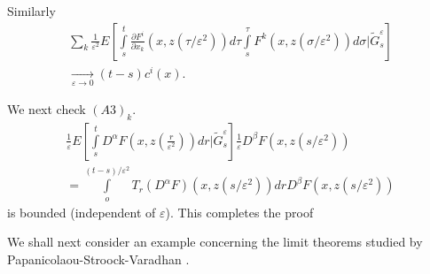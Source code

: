 Similarly
\begin{multline*}
  \sum_k \frac{1}{\varepsilon^2} 
  E\left[\int\limits^t_s \frac{\partial F^i}{\partial
      x_k}(x,z(\tau /\varepsilon^2))d \tau \int\limits^\tau _s F^k (x,z (\sigma
    /\varepsilon^2))d \sigma | \tilde{G}^\varepsilon _s\right]\\ 
\xrightarrow[\varepsilon \to 0]{}
  (t-s)c^i(x). 
\end{multline*}

We next check $(A3)_k$.
\begin{multline*}
  \frac{1}{\varepsilon}E \left[ \int\limits^t_s D^\alpha
    F\left(x,z\left(\frac{r}{\varepsilon^2}\right)\right)dr |\tilde 
    {G}^\varepsilon _s\right] \frac{1}{\varepsilon} D^\beta F(x,z(s/ \varepsilon^2))\\ 
  = \int\limits^{(t-s)/\varepsilon^2}_o T_r(D^\alpha F)(x,z(s/ \varepsilon^2))dr D^\beta
  F(x,z(s/ \varepsilon^2)) 
\end{multline*}
is bounded (independent of $\varepsilon$). This completes the proof

We shall next consider an example concerning the limit theorems studied
by Papanicolaou-Stroock-Varadhan \cite{29}. 

